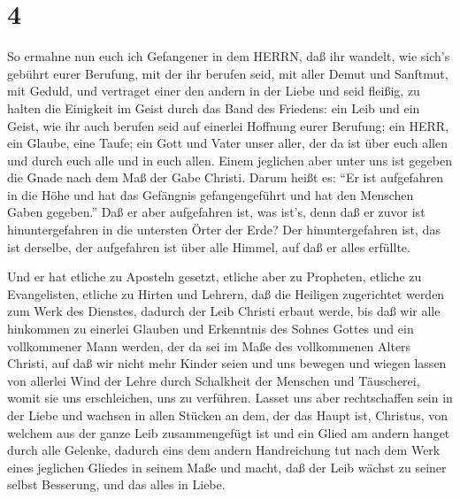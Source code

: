 \hypertarget{section-3}{%
\section{4}\label{section-3}}

 So ermahne nun euch ich Gefangener in dem HERRN, daß ihr
wandelt, wie sich's gebührt eurer Berufung, mit der ihr berufen seid,
 mit aller Demut und Sanftmut, mit Geduld, und vertraget
einer den andern in der Liebe  und seid fleißig, zu halten
die Einigkeit im Geist durch das Band des Friedens:  ein
Leib und ein Geist, wie ihr auch berufen seid auf einerlei Hoffnung
eurer Berufung;  ein HERR, ein Glaube, eine Taufe;
 ein Gott und Vater unser aller, der da ist über euch allen
und durch euch alle und in euch allen.  Einem jeglichen aber
unter uns ist gegeben die Gnade nach dem Maß der Gabe Christi.
 Darum heißt es: ``Er ist aufgefahren in die Höhe und hat
das Gefängnis gefangengeführt und hat den Menschen Gaben gegeben.''
 Daß er aber aufgefahren ist, was ist's, denn daß er zuvor
ist hinuntergefahren in die untersten Örter der Erde?  Der
hinuntergefahren ist, das ist derselbe, der aufgefahren ist über alle
Himmel, auf daß er alles erfüllte.

 Und er hat etliche zu Aposteln gesetzt, etliche aber zu
Propheten, etliche zu Evangelisten, etliche zu Hirten und Lehrern,
 daß die Heiligen zugerichtet werden zum Werk des Dienstes,
dadurch der Leib Christi erbaut werde,  bis daß wir alle
hinkommen zu einerlei Glauben und Erkenntnis des Sohnes Gottes und ein
vollkommener Mann werden, der da sei im Maße des vollkommenen Alters
Christi,  auf daß wir nicht mehr Kinder seien und uns
bewegen und wiegen lassen von allerlei Wind der Lehre durch Schalkheit
der Menschen und Täuscherei, womit sie uns erschleichen, uns zu
verführen.  Lasset uns aber rechtschaffen sein in der Liebe
und wachsen in allen Stücken an dem, der das Haupt ist, Christus,
 von welchem aus der ganze Leib zusammengefügt ist und ein
Glied am andern hanget durch alle Gelenke, dadurch eins dem andern
Handreichung tut nach dem Werk eines jeglichen Gliedes in seinem Maße
und macht, daß der Leib wächst zu seiner selbst Besserung, und das alles
in Liebe.

